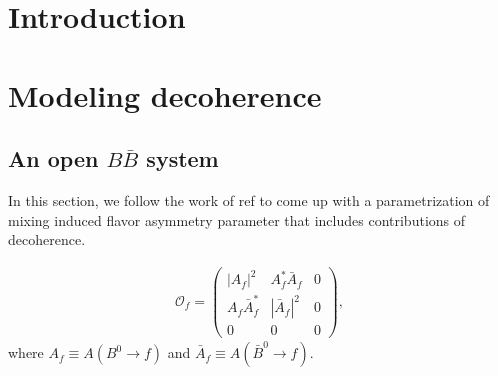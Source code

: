
\chapter{Introduction}



\chapter{Modeling decoherence}

\section{An open $B\bar{B}$ system}

In this section, we follow the work of ref \cite{ALOK} to come up with a parametrization of mixing induced flavor asymmetry parameter that includes contributions of decoherence.

\begin{align}
\label{eq:observable}
\mathcal{O}_f = 
\begin{pmatrix}
|A_f|^2 & A_f^*\bar{A}_f & 0 \\
A_f\bar{A}_f^* & |\bar{A}_f|^2 & 0 \\
0 & 0 & 0
\end{pmatrix},
\end{align}
where $A_f \equiv A(B^0\rightarrow f)$ and $\bar{A}_f \equiv A(\bar{B}^0\rightarrow f)$.

